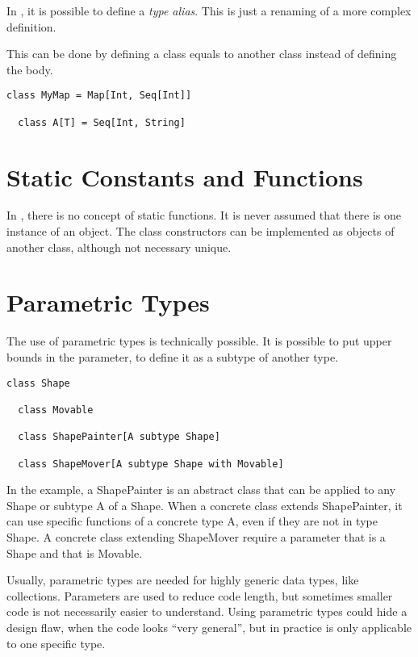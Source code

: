 In \Soda, it is possible to define a \textit{type alias}.
This is just a renaming of a more complex definition.

This can be done by defining a class equals to another class instead of defining the body.

\begin{lstlisting}[label={lst:exampleTypeAlias}]
  class MyMap = Map[Int, Seq[Int]]

  class A[T] = Seq[Int, String]
\end{lstlisting}


\section{Static Constants and Functions}

In \Soda, there is no concept of static functions.
It is never assumed that there is one instance of an object.
The class constructors can be implemented as objects of another class, although not necessary unique.


\section{Parametric Types}

The use of parametric types is technically possible.
It is possible to put upper bounds in the parameter, to define it as a subtype of another type.

\begin{lstlisting}[label={lst:exampleUpperBoundParameter}]
  class Shape

  class Movable

  class ShapePainter[A subtype Shape]

  class ShapeMover[A subtype Shape with Movable]
\end{lstlisting}

In the example, a ShapePainter is an abstract class that can be applied to any Shape or subtype A of a Shape.
When a concrete class extends ShapePainter, it can use specific functions of a concrete type A, even if they are not in type Shape.
A concrete class extending ShapeMover require a parameter that is a Shape and that is Movable.

Usually, parametric types are needed for highly generic data types, like collections.
Parameters are used to reduce code length, but sometimes smaller code is not necessarily easier to understand.
Using parametric types could hide a design flaw, when the code looks ``very general'', but in practice is only applicable to one specific type.


